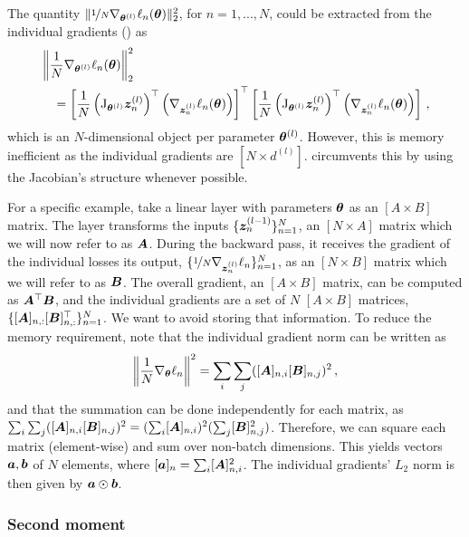 The quantity $\lVert \nicefrac{1}{N}
\nabla_{{\bm{\theta}}^{(l)}}\ell_n({\bm{\theta}})\rVert_2^2$, for $n=1, ..., N$, could be
extracted from the individual gradients
() as
\begin{align*}
  \begin{split}
    &\left\lVert \frac{1}{N}  \nabla_{{\bm{\theta}}^{(l)}}\ell_n({\bm{\theta}}) \right\rVert_2^2
    \\
    &\quad=
      \left[\frac{1}{N} \left(\mathrm{J}_{{\bm{\theta}}^{(l)}} {\bm{z}}^{(l)}_n\right)^\top
      \left(\nabla_{{\bm{z}}^{(l)}_n}\ell_n({\bm{\theta}})\right)\right]^\top
      \left[
      \frac{1}{N} \left(\mathrm{J}_{{\bm{\theta}}^{(l)}} {\bm{z}}^{(l)}_n\right)^\top
      \left(\nabla_{{\bm{z}}^{(l)}_n}\ell_n({\bm{\theta}})\right)
      \right]\,{,}
  \end{split}
\end{align*}
which is an $N$-dimensional object per parameter ${\bm{\theta}}^{(l)}$. However, this
is memory inefficient as the individual gradients are $[N \times d^{(l)}]$.
\BackPACK circumvents this by using the Jacobian's structure whenever possible.

For a specific example, take a linear layer with parameters ${\bm{\theta}}$ as an $[A
\times B]$ matrix. The layer transforms the inputs $\{{\bm{z}}^{(l-1)}_n\}_{n=1}^N$,
an $[N \times A]$ matrix which we will now refer to as ${\bm{A}}$. During the
backward pass, it receives the gradient of the individual losses \wrt its
output, $\{\nicefrac{1}{N} \nabla_{{\bm{z}}^{(l)}_n} \ell_n\}_{n=1}^N$, as an $[N
\times B]$ matrix which we will refer to as ${\bm{B}}$. The overall gradient, an $[A
\times B]$ matrix, can be computed as ${\bm{A}}^\top {\bm{B}}$, and the individual
gradients are a set of $N$ $[A \times B]$ matrices, $\{[{\bm{A}}]_{n,:}
[{\bm{B}}]_{n,:}^\top\}_{n=1}^{N}$. We want to avoid storing that information. To
reduce the memory requirement, note that the individual gradient norm can be
written as
\[
  \left\lVert\frac{1}{N}\nabla_{\bm{\theta}} \ell_n\right\rVert^2 = \sum_i \sum_j
  ([{\bm{A}}]_{n,i} [{\bm{B}}]_{n,j})^2\,{,}
\]
and that the summation can be done independently for each matrix, as $\sum_i
\sum_j ([{\bm{A}}]_{n,i} [{\bm{B}}]_{n,j})^2 = (\sum_i [{\bm{A}}]_{n,i})^2 (\sum_j [{\bm{B}}]_{n,j}^2)$.
Therefore, we can square each matrix (element-wise) and sum over non-batch
dimensions. This yields vectors ${\bm{a}}, {\bm{b}}$ of $N$ elements, where $[{\bm{a}}]_n =
\sum_i [{\bm{A}}]_{n,i}^2$. The individual gradients' $L_2$ norm is then given by ${\bm{a}}
\odot {\bm{b}}$.

\subsubsection{Second moment}

